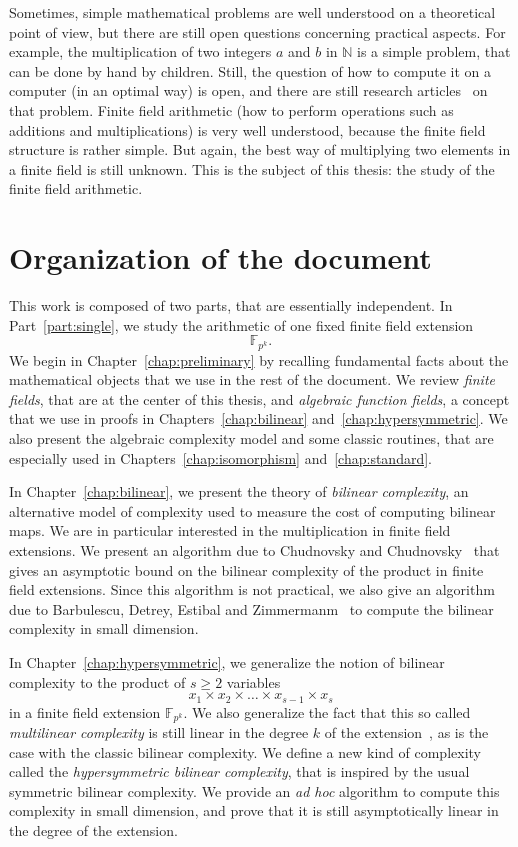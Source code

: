 Sometimes, simple mathematical problems are well understood on a theoretical
point of view, but there are still open questions concerning practical aspects.
For example, the multiplication of two integers $a$ and $b$ in $\mathbb{N}$ is a
simple problem, that can be done by hand by children. Still, the question of how
to compute it on a computer (in an optimal way) is open, and there are still
research articles~\cite{HVDH19} on that problem.
Finite field arithmetic (\ie how to perform operations such as additions and
multiplications) is very well understood, because the finite field structure is
rather simple. But again, the best way of multiplying two elements in a finite
field is still unknown. This is the subject of this thesis: the study of the
finite field arithmetic.

\section{Organization of the document}

This work is composed of two parts, that are essentially independent. In
Part~\ref{part:single}, we study the arithmetic of one fixed finite field
extension
\[
  \mathbb{F}_{p^k}.
\]
We begin in Chapter~\ref{chap:preliminary} by recalling fundamental
facts about the mathematical objects that we use in the rest of the document. We
review \emph{finite fields}, that are at the center of this thesis, and
\emph{algebraic function fields}, a concept that we use in proofs in
Chapters~\ref{chap:bilinear} and~\ref{chap:hypersymmetric}. We also
present the algebraic complexity model and some classic routines, that are
especially used in Chapters~\ref{chap:isomorphism} and~\ref{chap:standard}.

In Chapter~\ref{chap:bilinear}, we present the theory of \emph{bilinear
complexity}, an
alternative model of complexity used to measure the cost of computing bilinear
maps. We are in particular interested in the multiplication in finite field
extensions. We present an algorithm due to Chudnovsky and Chudnovsky~\cite{CC88}
that gives an asymptotic bound on the bilinear complexity of the product in
finite field extensions. Since this algorithm is not practical, we also give an
algorithm due to Barbulescu, Detrey, Estibal and Zimmermanm~\cite{BDEZ12} to
compute the bilinear complexity in small dimension.

In Chapter~\ref{chap:hypersymmetric}, we generalize the notion of bilinear
complexity to the product of $s\geq2$ variables
\[
  x_1\times x_2\times\dots\times x_{s-1}\times x_s
\]
in a finite field extension $\mathbb{F}_{p^k}$. We also generalize the fact
that this so called \emph{multilinear complexity} is still linear in the degree
$k$ of the extension~\cite{RR21}, as is the case with
the classic bilinear complexity. We define a new kind of complexity called the
\emph{hypersymmetric bilinear complexity}, that is inspired by the usual
symmetric bilinear complexity. We provide an \emph{ad hoc} algorithm to compute
this complexity in small dimension, and prove that it is still asymptotically
linear in the degree of the extension.

